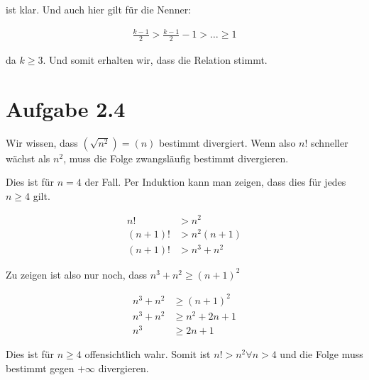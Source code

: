 \documentclass[a4paper,german,12pt,smallheadings]{scrartcl}
\begin{document}
ist klar. Und auch hier gilt für die Nenner:

\begin{align*}
  \frac{k-1}{2} > \frac{k-1}{2} -1 > \dots \ge 1
\end{align*}

da $k \ge 3$. Und somit erhalten wir, dass die Relation stimmt.

\section*{Aufgabe 2.4}
Wir wissen, dass $\left(\sqrt{n^2}\right) = (n)$ bestimmt divergiert. Wenn also
$n!$ schneller wächst als $n^2$, muss die Folge zwangsläufig bestimmt
divergieren.

Dies ist für $n = 4$ der Fall. Per Induktion kann man zeigen, dass dies für
jedes $n \ge 4$ gilt.

\begin{align*}
  n! &> n^2 \\
  (n+1)! &> n^2(n+1) \\
  (n+1)! &> n^3+n^2
\end{align*}

Zu zeigen ist also nur noch, dass $n^3+n^2 \ge (n+1)^2$

\begin{align*}
  n^3+n^2 &\ge (n+1)^2 \\
  n^3+n^2 &\ge n^2+2n+1 \\
  n^3 &\ge 2n+1
\end{align*}

Dies ist für $n \ge 4$ offensichtlich wahr. Somit ist $n! > n^2 \forall n > 4$
und die Folge muss bestimmt gegen $+\infty$ divergieren.
\end{document}
